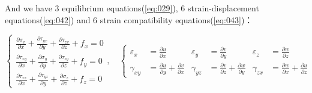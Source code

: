 \documentclass[en,hazy,cyan,8pt,normal]{elegantnote}
\numberwithin{equation}{section}
\begin{document}
  And we have 3 equilibrium equations(\cref{eq:029}), 6 strain-displacement equations(\cref{eq:042}) and 6 strain compatibility equations(\cref{eq:043})：

  \begin{equation}\label{eq:052}
    \left\{
      \begin{aligned}
        \frac{\partial \sigma_{x}}{\partial x} + \frac{\partial \tau_{yx}}{\partial y} + \frac{\partial \tau_{zx}}{\partial z} + f_{x} = 0 \\
        \frac{\partial \tau_{xy}}{\partial x} + \frac{\partial \sigma_{y}}{\partial y} + \frac{\partial \tau_{zy}}{\partial z} + f_{y} = 0 \\
        \frac{\partial \tau_{xz}}{\partial x} + \frac{\partial \tau_{yz}}{\partial y} + \frac{\partial \sigma_{z}}{\partial z} + f_{z} = 0
      \end{aligned}
    \right.
    , \quad
    \left\{
      \begin{aligned}
        \varepsilon_{x} &= \frac{\partial u}{\partial x} & \varepsilon_{y} &= \frac{\partial v}{\partial y} & \varepsilon_{z} &= \frac{\partial w}{\partial z} \\
        \gamma_{xy} &= \frac{\partial u}{\partial y} + \frac{\partial v}{\partial x} & \gamma_{yz} &= \frac{\partial v}{\partial z} + \frac{\partial w}{\partial y} & \gamma_{zx} &= \frac{\partial w}{\partial x} + \frac{\partial u}{\partial z}
      \end{aligned}
    \right.
  \end{equation}
\end{document}
